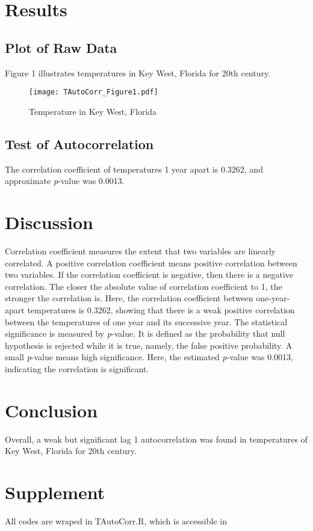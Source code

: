 \documentclass[12pt]{paper}
\begin{document}
  \section{Results}
    
    \subsection{Plot of Raw Data}
    Figure 1 illustrates temperatures in Key West, Florida for 20th century.
    
    \begin{figure}[H]
        \centering
        \texttt{[image: TAutoCorr\_Figure1.pdf]}
        \caption{Temperature in Key West, Florida}
        \label{Fig. 2}    
    \end{figure}

    \subsection{Test of Autocorrelation}
    The correlation coefficient of temperatures 1 year apart is 0.3262, and approximate 
    \textit{p}-value was 0.0013.

  \section{Discussion}
  Correlation coefficient measures the extent that two variables are linearly correlated.
  A positive correlation coefficient means positive correlation between two variables. If 
  the correlation coefficient is negative, then there is a negative correlation. The closer
  the absolute value of correlation coefficient to 1, the stronger the correlation is. Here, the
  correlation coefficient between one-year-apart temperatures is 0.3262, showing that there is a weak 
  positive correlation between the temperatures of one year and its successive year.
  \newline
  The statistical significance is measured by \textit{p}-value. It is defined as the probability that
  null hypothesis is rejected while it is true, namely, the false positive probability. A 
  small \textit{p}-value means high significance. Here, the 
  estimated \textit{p}-value was 0.0013, indicating the correlation is significant.

  \section{Conclusion}
  Overall, a weak but significant lag 1 autocorrelation was found in temperatures of Key West, Florida 
  for 20th century.

  \section{Supplement}
  All codes are wraped in TAutoCorr.R, which is accessible in 
\end{document}
